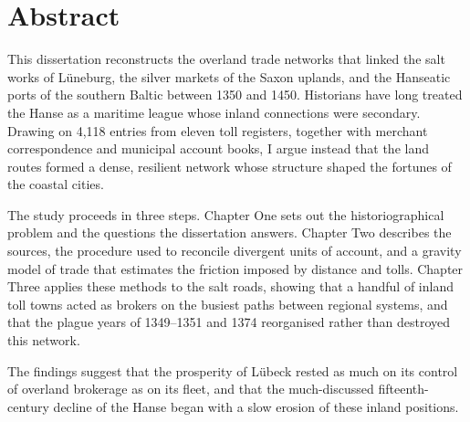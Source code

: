 \chapter*{Abstract}

This dissertation reconstructs the overland trade networks that linked the salt works of Lüneburg, the silver markets of the Saxon uplands, and the Hanseatic ports of the southern Baltic between 1350 and 1450. Historians have long treated the Hanse as a maritime league whose inland connections were secondary. Drawing on 4,118 entries from eleven toll registers, together with merchant correspondence and municipal account books, I argue instead that the land routes formed a dense, resilient network whose structure shaped the fortunes of the coastal cities.

The study proceeds in three steps. Chapter One sets out the historiographical problem and the questions the dissertation answers. Chapter Two describes the sources, the procedure used to reconcile divergent units of account, and a gravity model of trade that estimates the friction imposed by distance and tolls. Chapter Three applies these methods to the salt roads, showing that a handful of inland toll towns acted as brokers on the busiest paths between regional systems, and that the plague years of 1349--1351 and 1374 reorganised rather than destroyed this network.

The findings suggest that the prosperity of Lübeck rested as much on its control of overland brokerage as on its fleet, and that the much-discussed fifteenth-century decline of the Hanse began with a slow erosion of these inland positions.
\clearpage
